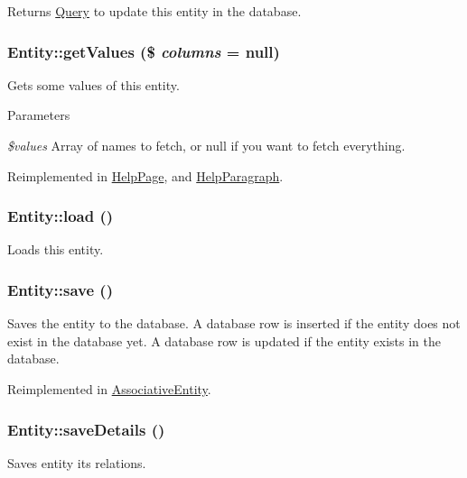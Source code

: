 \begin{DoxyReturn}{Returns}
\hyperlink{classQuery}{Query} to update this entity in the database. 
\end{DoxyReturn}
\hypertarget{classEntity_aec1be209327cfcf2dc528a3a565a7a5f}{
\subsubsection[{getValues}]{\setlength{\rightskip}{0pt plus 5cm}Entity::getValues (\$ {\em columns} = {\ttfamily null})}}
\label{classEntity_aec1be209327cfcf2dc528a3a565a7a5f}
Gets some values of this entity.


\begin{DoxyParams}{Parameters}
\item[{\em \$values}]Array of names to fetch, or null if you want to fetch everything. \end{DoxyParams}


Reimplemented in \hyperlink{classHelpPage_ac4e71d65d287b8e0c1a48a298ccbcd01}{HelpPage}, and \hyperlink{classHelpParagraph_ab86c3034d2e3c9178c83abbc3eca8ee3}{HelpParagraph}.

\hypertarget{classEntity_af2decf2a7bc0aef76e5adcd46a192e05}{
\subsubsection[{load}]{\setlength{\rightskip}{0pt plus 5cm}Entity::load ()}}
\label{classEntity_af2decf2a7bc0aef76e5adcd46a192e05}
Loads this entity. \hypertarget{classEntity_af4822c7e840cf775ca98c2fce2d8de49}{
\subsubsection[{save}]{\setlength{\rightskip}{0pt plus 5cm}Entity::save ()}}
\label{classEntity_af4822c7e840cf775ca98c2fce2d8de49}
Saves the entity to the database. A database row is inserted if the entity does not exist in the database yet. A database row is updated if the entity exists in the database. 

Reimplemented in \hyperlink{classAssociativeEntity_a6a68659dda2caa94f624ac856933a90a}{AssociativeEntity}.

\hypertarget{classEntity_a48cdc3830bf695078a69a56f23e1b874}{
\subsubsection[{saveDetails}]{\setlength{\rightskip}{0pt plus 5cm}Entity::saveDetails ()}}
\label{classEntity_a48cdc3830bf695078a69a56f23e1b874}
Saves entity its relations. 

